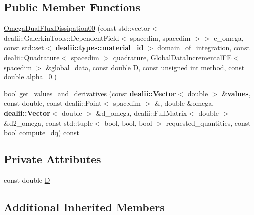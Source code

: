 \subsection*{Public Member Functions}
\begin{DoxyCompactItemize}
\item 
\hyperlink{classincremental_f_e_1_1_omega_dual_flux_dissipation00_a4f1fb84afb78bd1718ba36c63fe3a22b}{Omega\+Dual\+Flux\+Dissipation00} (const std\+::vector$<$ dealii\+::\+Galerkin\+Tools\+::\+Dependent\+Field$<$ spacedim, spacedim $>$$>$ e\+\_\+omega, const std\+::set$<$ {\bf dealii\+::types\+::material\+\_\+id} $>$ domain\+\_\+of\+\_\+integration, const dealii\+::\+Quadrature$<$ spacedim $>$ quadrature, \hyperlink{classincremental_f_e_1_1_global_data_incremental_f_e}{Global\+Data\+Incremental\+FE}$<$ spacedim $>$ \&\hyperlink{classincremental_f_e_1_1_omega_3_01spacedim_00_01spacedim_01_4_afffe781a5a2032ec003032adc78e1bf3}{global\+\_\+data}, const double \hyperlink{classincremental_f_e_1_1_omega_dual_flux_dissipation00_a922910cdc92b29321d37bf46dc50f41a}{D}, const unsigned int \hyperlink{classincremental_f_e_1_1_omega_3_01spacedim_00_01spacedim_01_4_a6c95d57122261e8a2e26d3818251bc9b}{method}, const double \hyperlink{classincremental_f_e_1_1_omega_3_01spacedim_00_01spacedim_01_4_ad881c36804cc027c301f4f069756c2db}{alpha}=0.)
\item 
bool \hyperlink{classincremental_f_e_1_1_omega_dual_flux_dissipation00_a27833d3c88054ddf2231a32c6c6b2d2d}{get\+\_\+values\+\_\+and\+\_\+derivatives} (const {\bf dealii\+::\+Vector}$<$ double $>$ \&{\bf values}, const double, const dealii\+::\+Point$<$ spacedim $>$ \&, double \&omega, {\bf dealii\+::\+Vector}$<$ double $>$ \&d\+\_\+omega, dealii\+::\+Full\+Matrix$<$ double $>$ \&d2\+\_\+omega, const std\+::tuple$<$ bool, bool, bool $>$ requested\+\_\+quantities, const bool compute\+\_\+dq) const 
\end{DoxyCompactItemize}
\subsection*{Private Attributes}
\begin{DoxyCompactItemize}
\item 
const double \hyperlink{classincremental_f_e_1_1_omega_dual_flux_dissipation00_a922910cdc92b29321d37bf46dc50f41a}{D}
\end{DoxyCompactItemize}
\subsection*{Additional Inherited Members}


